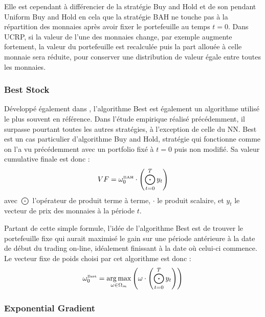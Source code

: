 \documentclass[a4paper, 10pt]{article}
\DeclareMathOperator*{\argmax}{arg\,max}
\begin{document}
Elle est cependant à différencier de la stratégie Buy and Hold et de son pendant Uniform Buy and Hold en cela que la stratégie BAH ne touche pas à la répartition des monnaies après avoir fixer le portefeuille au temps $t=0$. Dans UCRP, si la valeur de l'une des monnaies change, par exemple augmente fortement, la valeur du portefeuille est recalculée puis la part allouée à celle monnaie sera réduite, pour conserver une distribution de valeur égale entre toutes les monnaies.

\subsubsection{Best Stock}

Développé également dans \cite{Cover1991}, l'algorithme Best est également un algorithme utilisé le plus souvent en référence. Dans l'étude empirique réalisé précédemment, il surpasse pourtant toutes les autres stratégies, à l'exception de celle du NN. Best est un cas particulier d'algorithme Buy and Hold, stratégie qui fonctionne comme on l'a vu précédemment avec un portfolio fixé à $t=0$ puis non modifié. Sa valeur cumulative finale est donc :
\begin{equation}
    VF = \omega_0^{\text{\tiny BAH}} \cdot \left( \bigodot_{t=0}^{T} y_t \right)
\end{equation}
avec $\bigodot$ l'opérateur de produit terme à terme, $\cdot$ le produit scalaire, et $y_t$ le vecteur de prix des monnaies à la période $t$.

Partant de cette simple formule, l'idée de l'algorithme Best est de trouver le portefeuille fixe qui aurait maximisé le gain sur une période antérieure à la date de début du trading on-line, idéalement finissant à la date où celui-ci commence. Le vecteur fixe de poids choisi par cet algorithme est donc :
\begin{equation}
    \omega_0^{\text{\tiny Best}} = \argmax_{\omega \in \Omega_m} \left( \omega \cdot \left(\bigodot_{t=0}^{T} y_t \right)\right)
\end{equation}

\subsubsection{Exponential Gradient}
\end{document}
